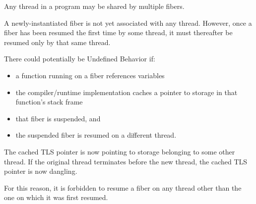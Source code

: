 \label{xthread}

Any thread in a program may be shared by multiple fibers.

A newly-instantiated fiber is not yet associated with any thread. However,
once a fiber has been resumed the first time by some thread, it must
thereafter be resumed only by that same thread.

There could potentially be Undefined Behavior if:
\begin{itemize}
    \item a function running on a fiber references  variables
    \item the compiler/runtime implementation caches a pointer
          to  storage in that function's stack frame
    \item that fiber is suspended, and
    \item the suspended fiber is resumed on a different thread.
\end{itemize}

The cached TLS pointer is now pointing to storage belonging to some other
thread. If the original thread terminates before the new thread, the cached
TLS pointer is now dangling.

For this reason, it is forbidden to resume a fiber on any thread other than
the one on which it was first resumed.
